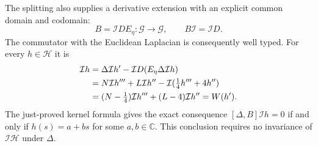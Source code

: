 The splitting also supplies a derivative extension with an explicit
common domain and codomain:
\[
 B=\mathcal I DE_\eta:\mathscr G\longrightarrow\mathscr G,\qquad B\mathcal I =\mathcal I D .
\]
The commutator with the Euclidean Laplacian is consequently well typed.
For every $h\in\mathscr H$ it is
\begin{align}
 [\Delta,B]\mathcal I h
 &=\Delta \mathcal I h'-\mathcal I D(E_\eta\Delta \mathcal I h)\notag\\
 &=N\mathcal I h'''+L\mathcal I h''-\mathcal I (\tfrac14h'''+4h'')\notag\\
 &=(N-\tfrac14)\mathcal I h'''+(L-4)\mathcal I h''=W(h').
 \label{eq:cq-spatial-commutator}
\end{align}
The just-proved kernel formula gives the exact consequence
$[\Delta,B]\mathcal I h=0$ if and only if $h(s)=a+bs$ for some $a,b\in\mathbb C$.
This conclusion requires no invariance of $\mathcal I \mathscr H$ under $\Delta$.


